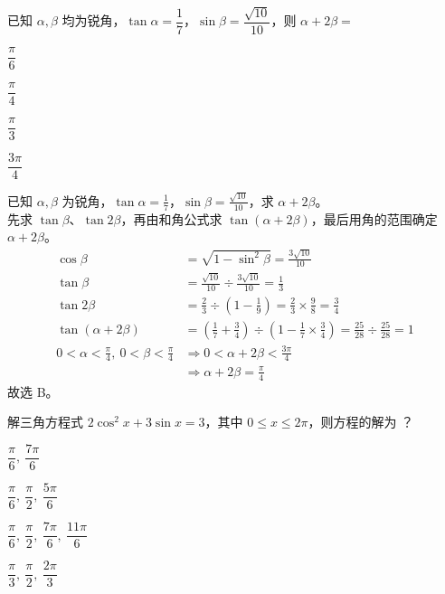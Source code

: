\documentclass[12pt,a4paper,fontset=none]{exam-zh}
\begin{document}
\begin{question}
    已知 $\alpha,\beta$ 均为锐角，$\tan\alpha=\dfrac{1}{7}$，$\sin\beta=\dfrac{\sqrt{10}}{10}$，则 $\alpha+2\beta=$ \paren[B]
    \begin{choices}
        \item $\dfrac{\pi}{6}$
        \item $\dfrac{\pi}{4}$
        \item $\dfrac{\pi}{3}$
        \item $\dfrac{3\pi}{4}$
    \end{choices}
\end{question}

\begin{solution}
    已知 $\alpha,\beta$ 为锐角，$\tan\alpha=\frac{1}{7}$，$\sin\beta=\frac{\sqrt{10}}{10}$，求 $\alpha+2\beta$。 \\
    先求 $\tan\beta$、$\tan2\beta$，再由和角公式求 $\tan(\alpha+2\beta)$，最后用角的范围确定 $\alpha+2\beta$。 \\
    \begin{align*}
        \cos\beta&=\sqrt{1-\sin^2\beta}=\frac{3\sqrt{10}}{10} \\
        \tan\beta&=\frac{\sqrt{10}}{10}\div\frac{3\sqrt{10}}{10}=\frac{1}{3} \\
        \tan2\beta&=\frac{2}{3}\div\left(1-\frac{1}{9}\right)=\frac{2}{3}\times\frac{9}{8}=\frac{3}{4} \\
        \tan(\alpha+2\beta)&=\left(\frac{1}{7}+\frac{3}{4}\right)\div\left(1-\frac{1}{7}\times\frac{3}{4}\right)=\frac{25}{28}\div\frac{25}{28}=1 \\
        0<\alpha<\frac{\pi}{4},\ 0<\beta<\frac{\pi}{4}&\Rightarrow 0<\alpha+2\beta<\frac{3\pi}{4} \\
        &\Rightarrow \alpha+2\beta=\frac{\pi}{4}
    \end{align*}
    故选 B。
\end{solution}

\begin{question}
    解三角方程式 $2\cos^2x+3\sin x=3$，其中 $0\le x\le 2\pi$，则方程的解为 \paren[B]？
    \begin{choices}
        \item $\dfrac{\pi}{6},\ \dfrac{7\pi}{6}$
        \item $\dfrac{\pi}{6},\ \dfrac{\pi}{2},\ \dfrac{5\pi}{6}$
        \item $\dfrac{\pi}{6},\ \dfrac{\pi}{2},\ \dfrac{7\pi}{6},\ \dfrac{11\pi}{6}$
        \item $\dfrac{\pi}{3},\ \dfrac{\pi}{2},\ \dfrac{2\pi}{3}$
    \end{choices}
\end{question}
\end{document}
